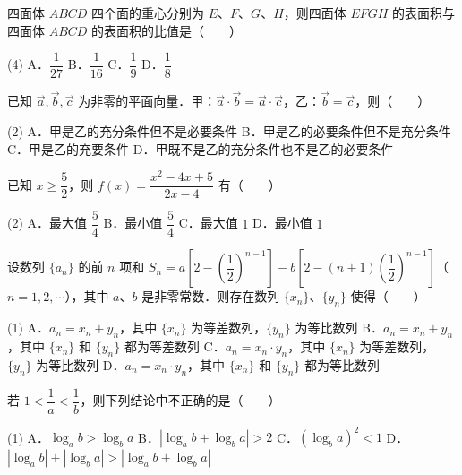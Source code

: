 \begin{question}
四面体 $ABCD$ 四个面的重心分别为 $E$、$F$、$G$、$H$，则四面体 $EFGH$ 的表面积与四面体 $ABCD$ 的表面积的比值是\mbox{（　　）}

\begin{gkopts}(4)
\task A．$\dfrac{1}{27}$
\task B．$\dfrac{1}{16}$
\task C．$\dfrac{1}{9}$
\task D．$\dfrac{1}{8}$
\end{gkopts}

\end{question}
\begin{question}
已知 $\vec{a}, \vec{b}, \vec{c}$ 为非零的平面向量．甲：$\vec{a} \cdot \vec{b} = \vec{a} \cdot \vec{c}$，乙：$\vec{b} = \vec{c}$，则\mbox{（　　）}

\begin{gkopts}(2)
\task A．甲是乙的充分条件但不是必要条件
\task B．甲是乙的必要条件但不是充分条件
\task C．甲是乙的充要条件
\task D．甲既不是乙的充分条件也不是乙的必要条件
\end{gkopts}

\end{question}
\begin{question}
已知 $x \geqslant \dfrac{5}{2}$，则 $f(x) = \dfrac{x^2 - 4x + 5}{2x - 4}$ 有\mbox{（　　）}

\begin{gkopts}(2)
\task A．最大值 $\dfrac{5}{4}$
\task B．最小值 $\dfrac{5}{4}$
\task C．最大值 $1$
\task D．最小值 $1$
\end{gkopts}

\end{question}
\begin{question}
设数列 $\{a_n\}$ 的前 $n$ 项和 $S_n = a\left[2 - \left(\dfrac{1}{2}\right)^{n-1}\right] - b\left[2 - (n + 1)\left(\dfrac{1}{2}\right)^{n-1}\right]$（$n = 1, 2, \cdots$），其中 $a$、$b$ 是非零常数．则存在数列 $\{x_n\}$、$\{y_n\}$ 使得\mbox{（　　）}

\begin{gkopts}(1)
\task A．$a_n = x_n + y_n$，其中 $\{x_n\}$ 为等差数列，$\{y_n\}$ 为等比数列
\task B．$a_n = x_n + y_n$，其中 $\{x_n\}$ 和 $\{y_n\}$ 都为等差数列
\task C．$a_n = x_n \cdot y_n$，其中 $\{x_n\}$ 为等差数列，$\{y_n\}$ 为等比数列
\task D．$a_n = x_n \cdot y_n$，其中 $\{x_n\}$ 和 $\{y_n\}$ 都为等比数列
\end{gkopts}

\end{question}
\begin{question}
若 $1 < \dfrac{1}{a} < \dfrac{1}{b}$，则下列结论中不正确的是\mbox{（　　）}

\begin{gkopts}(1)
\task A．$\log_a b > \log_b a$
\task B．$|\log_a b + \log_b a| > 2$
\task C．$(\log_b a)^2 < 1$
\task D．$|\log_a b| + |\log_b a| > |\log_a b + \log_b a|$
\end{gkopts}

\end{question}
